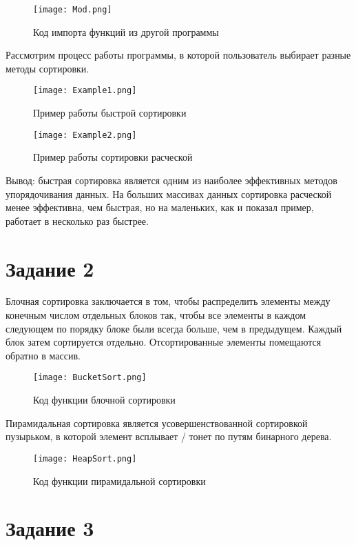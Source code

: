 \documentclass[14pt]{extreport}
\begin{document}
\begin{figure}[H]
\centerline{\texttt{[image: Mod.png]}}
\caption{Код импорта функций из другой программы}
\label{fig13}
\end{figure}

Рассмотрим процесс работы программы, в которой пользователь выбирает разные методы сортировки.

\begin{figure}[H]
\centerline{\texttt{[image: Example1.png]}}
\caption{Пример работы быстрой сортировки}
\label{fig14}
\end{figure}

\begin{figure}[H]
\centerline{\texttt{[image: Example2.png]}}
\caption{Пример работы сортировки расческой}
\label{fig15}
\end{figure}

Вывод: быстрая сортировка является одним из наиболее эффективных методов упорядочивания данных. На больших массивах данных сортировка расческой менее эффективна, чем быстрая, но на маленьких, как и показал пример, работает в несколько раз быстрее.

\chapter{Задание 2}

Блочная сортировка заключается в том, чтобы распределить элементы между конечным числом отдельных блоков так, чтобы все элементы в каждом следующем по порядку блоке были всегда больше, чем в предыдущем. Каждый блок затем сортируется отдельно. Отсортированные элементы помещаются обратно в массив.

\begin{figure}[H]
\centerline{\texttt{[image: BucketSort.png]}}
\caption{Код функции блочной сортировки}
\label{fig16}
\end{figure}

Пирамидальная сортировка является усовершенствованной сортировкой пузырьком, в которой элемент всплывает / тонет по путям бинарного дерева.

\begin{figure}[H]
\centerline{\texttt{[image: HeapSort.png]}}
\caption{Код функции пирамидальной сортировки}
\label{fig17}
\end{figure}

\chapter{Задание 3}
\end{document}
